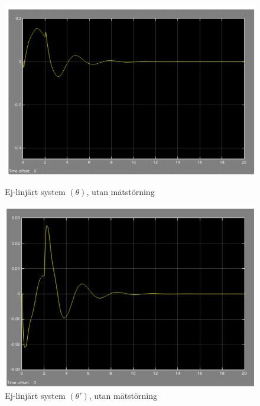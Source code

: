 \documentclass[11pt]{article}
\begin{document}
\begin{figure}[h!]
\centering
\includegraphics[scale=0.9]{Figures/simlink_1}
\caption{Ej-linjärt system $(\theta)$, utan mätstörning}
\vspace{3em}
\includegraphics[scale=0.9]{Figures/simlink_2}
\caption{Ej-linjärt system $(\theta \prime)$, utan mätstörning}
\end{figure}
\newpage
\end{document}
